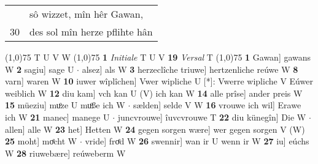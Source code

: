 \documentclass[8pt,a4paper,notitlepage]{article}
\begin{document}
\begin{table}[ht]
\begin{minipage}[t]{0.5\linewidth}
\begin{tabular}{rl}
 & sô wizzet, mîn hêr Gawan,\\ 
30 & des sol mîn herze pflihte hân\\ 
\end{tabular}
\scriptsize
\line(1,0){75} \newline
T U V W \newline
\line(1,0){75} \newline
\textbf{1} \textit{Initiale} T U V  \textbf{19} \textit{Versal} T  \newline
\line(1,0){75} \newline
\textbf{1} Gawan] gawans W \textbf{2} sagiu] sage U  $\cdot$ alsez] als W \textbf{3} herzeclîche triuwe] hertzenliche reúwe W \textbf{8} varn] waren W \textbf{10} iuwer wîplîchen] Vwer wipliche U [*]: Vwerre wipliche V Eúwer weiblich W \textbf{12} diu kam] vch kan U (V) ich kan W \textbf{14} alle prîse] ander preis W \textbf{15} müeziu] muͦze U muͦße ich W  $\cdot$ sælden] selde V W \textbf{16} vrouwe ich wil] Erawe ich W \textbf{21} manec] manege U  $\cdot$ juncvrouwe] îuvcvrouwe T \textbf{22} diu künegîn] Die W  $\cdot$ allen] alle W \textbf{23} het] Hetten W \textbf{24} gegen sorgen wære] wer gegen sorgen V (W) \textbf{25} moht] moͤcht W  $\cdot$ vride] froͤd W \textbf{26} swennir] wan ir U wenn ir W \textbf{27} iu] eúchs W \textbf{28} riuwebære] reúweberm W \newline
\end{minipage}
\end{table}
\end{document}
